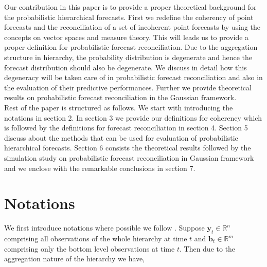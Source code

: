 \documentclass[a4paper, 11pt]{article}
\begin{document}
\noindent
Our contribution in this paper is to provide a proper theoretical background for the probabilistic hierarchical forecasts. First we redefine the coherency of point forecasts and the reconciliation of a set of incoherent point forecasts by using the concepts on vector spaces and measure theory. This will leads us to provide a proper definition for probabilistic forecast reconciliation. Due to the aggregation structure in hierarchy, the probability distribution is degenerate and hence the forecast distribution should also be degenerate. We discuss in detail how this degeneracy will be taken care of in probabilistic forecast reconciliation and also in the evaluation of their predictive performances. Further we provide theoretical results on probabilistic forecast reconciliation in the Gaussian framework. \\

\noindent
Rest of the paper is structured as follows. We start with introducing the notations in section 2. In section 3 we provide our definitions for coherency which is followed by the definitions for forecast reconciliation in section 4. Section 5 discuss about the methods that can be used for evaluation of probabilistic hierarchical forecasts. Section 6 consists the theoretical results followed by the simulation study on probabilistic forecast reconciliation in Gaussian framework and we enclose with the remarkable conclusions in section 7.     



\section{Notations}
We first introduce notations where possible we follow \citet{Wickramasuriya2017}. Suppose $\mathbold{y}_t \in \bm{\mathbb{R}}^n$ comprising all observations of the whole hierarchy at time $t$ and $\mathbold{b}_t \in \bm{\mathbb{R}}^m$ comprising only the bottom level observations at  time $t$. Then due to the aggregation nature of the hierarchy we have, 
\end{document}

